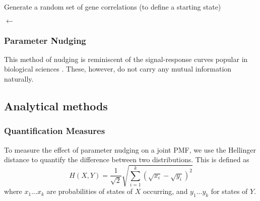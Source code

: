 \documentclass[../main.tex]{subfiles}
\begin{document}
\begin{algorithm}[H]
    \label{generate_correlations}
    \caption{Generate a random set of gene correlations (to define a starting state)}

    \BlankLine

    \Edges $\leftarrow$ \FindEdges{\Nodes} 
\end{algorithm}

\subsubsection{Parameter Nudging}

This method of nudging is reminiscent of the signal-response curves popular in biological sciences \cite{tyson2010functional}.
These, however, do not carry any mutual information naturally.

\subsection{Analytical methods}

\subsubsection{Quantification Measures}


To measure the effect of parameter nudging on a joint PMF, we use the Hellinger distance to quantify the difference between two distributions.
This is defined as
%
\begin{equation}
H(X, Y) = \frac{1}{\sqrt{2}} \sqrt{\sum^k_{i=1} (\sqrt{x_i} - \sqrt{y_i})^2}
\end{equation}
%
where ${x_1 ... x_k}$ are probabilities of states of $X$ occurring, and ${y_1 ... y_k}$ for states of $Y$.
\end{document}
